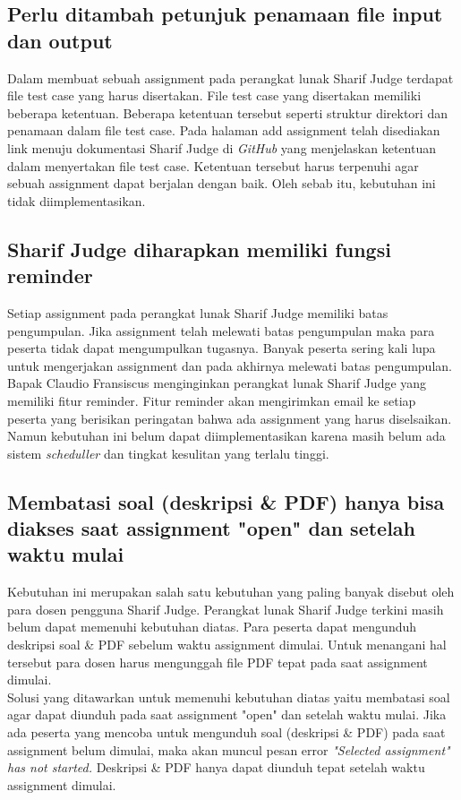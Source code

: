 \subsection{Perlu ditambah petunjuk penamaan file input dan output}
Dalam membuat sebuah assignment pada perangkat lunak Sharif Judge terdapat file test case yang harus disertakan. File test case yang disertakan memiliki beberapa ketentuan. Beberapa ketentuan tersebut seperti struktur direktori dan penamaan dalam file test case. Pada halaman add assignment telah disediakan link menuju dokumentasi Sharif Judge di \textit{GitHub} yang menjelaskan ketentuan dalam menyertakan file test case. Ketentuan tersebut harus terpenuhi agar sebuah assignment dapat berjalan dengan baik. Oleh sebab itu, kebutuhan ini tidak diimplementasikan.



\subsection{Sharif Judge diharapkan memiliki fungsi reminder}
Setiap assignment pada perangkat lunak Sharif Judge memiliki batas pengumpulan. Jika assignment telah melewati batas pengumpulan maka para peserta tidak dapat mengumpulkan tugasnya. Banyak peserta sering kali lupa untuk mengerjakan assignment dan pada akhirnya melewati batas pengumpulan. Bapak Claudio Fransiscus menginginkan perangkat lunak Sharif Judge yang memiliki fitur reminder. Fitur reminder akan mengirimkan email ke setiap peserta yang berisikan peringatan bahwa ada assignment yang harus diselsaikan. Namun kebutuhan ini belum dapat diimplementasikan karena masih belum ada sistem \textit{scheduller} dan tingkat kesulitan yang terlalu tinggi.

\subsection{Membatasi soal (deskripsi \& PDF) hanya bisa diakses saat assignment "open" dan setelah waktu mulai}
Kebutuhan ini merupakan salah satu kebutuhan yang paling banyak disebut oleh para dosen pengguna Sharif Judge. Perangkat lunak Sharif Judge terkini masih belum dapat memenuhi kebutuhan diatas. Para peserta dapat mengunduh deskripsi soal \& PDF sebelum waktu assignment dimulai. Untuk menangani hal tersebut para dosen harus mengunggah file PDF tepat pada saat assignment dimulai. \\
Solusi yang ditawarkan untuk memenuhi kebutuhan diatas yaitu membatasi soal agar dapat diunduh pada saat assignment "open" dan setelah waktu mulai. Jika ada peserta yang mencoba untuk mengunduh soal (deskripsi \& PDF) pada saat assignment belum dimulai, maka akan muncul pesan error \textit{"Selected \textit{assignment"} has not started.} Deskripsi \& PDF hanya dapat diunduh tepat setelah waktu assignment dimulai.

